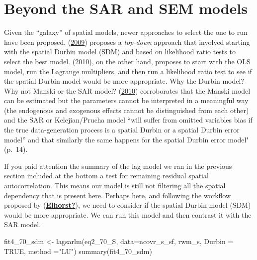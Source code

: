 \documentclass[
  krantz2]{krantz}
\makeatletter
\newenvironment{Shaded}{\begin{snugshade}}{\end{snugshade}}
\newcommand{\AttributeTok}[1]{\textcolor[rgb]{0.61,0.61,0.61}{#1}}
\newcommand{\ConstantTok}[1]{\textcolor[rgb]{0,0,0}{#1}}
\newcommand{\FunctionTok}[1]{\textcolor[rgb]{0,0,0}{#1}}
\newcommand{\NormalTok}[1]{#1}
\newcommand{\OtherTok}[1]{\textcolor[rgb]{0.37,0.37,0.37}{#1}}
\newcommand{\StringTok}[1]{\textcolor[rgb]{0.5,0.5,0.5}{#1}}
\newenvironment{kframe}{%
\medskip{}
\setlength{\fboxsep}{.8em}
 \def\at@end@of@kframe{}%
 \ifinner\ifhmode%
  \def\at@end@of@kframe{\end{minipage}}%
  \begin{minipage}{\columnwidth}%
 \fi\fi%
 \def\FrameCommand##1{\hskip\@totalleftmargin \hskip-\fboxsep
 \colorbox{shadecolor}{##1}\hskip-\fboxsep
     \hskip-\linewidth \hskip-\@totalleftmargin \hskip\columnwidth}%
 \MakeFramed {\advance\hsize-\width
   \@totalleftmargin\z@ \linewidth\hsize
   \@setminipage}}%
 {\par\unskip\endMakeFramed%
 \at@end@of@kframe}
\renewenvironment{Shaded}{\begin{kframe}}{\end{kframe}}
\makeatother
\begin{document}
\hypertarget{beyond-the-sar-and-sem-models}{%
\section{Beyond the SAR and SEM models}\label{beyond-the-sar-and-sem-models}}

Given the ``galaxy'' of spatial models, newer approaches to select the one to run have been proposed. (\protect\hyperlink{ref-LeSage_2009}{2009}) proposes a \emph{top-down} approach that involved starting with the spatial Durbin model (SDM) and based on likelihood ratio tests to select the best model. (\protect\hyperlink{ref-Elhorst_2010}{2010}), on the other hand, proposes to start with the OLS model, run the Lagrange multipliers, and then run a likelihood ratio test to see if the spatial Durbin model would be more appropriate. Why the Durbin model? Why not Manski or the SAR model? (\protect\hyperlink{ref-Elhorst_2010}{2010}) corroborates that the Manski model can be estimated but the parameters cannot be interpreted in a meaningful way (the endogenous and exogenous effects cannot be distinguished from each other) and the SAR or Kelejian/Prucha model ``will suffer from omitted variables bias if the true data-generation process is a spatial Durbin or a spatial Durbin error model'' and that similarly the same happens for the spatial Durbin error model" (p.~14).

If you paid attention the summary of the lag model we ran in the previous section included at the bottom a test for remaining residual spatial autocorrelation. This means our model is still not filtering all the spatial dependency that is present here. Perhaps here, and following the workflow proposed by (\protect\hyperlink{ref-Elhorst}{\textbf{Elhorst?}}), we need to consider if the spatial Durbin model (SDM) would be more appropriate. We can run this model and then contrast it with the SAR model.

\begin{Shaded}
\begin{Highlighting}[]
\NormalTok{fit4\_70\_sdm }\OtherTok{\textless{}{-}} \FunctionTok{lagsarlm}\NormalTok{(eq2\_70\_S, }\AttributeTok{data=}\NormalTok{ncovr\_s\_sf, rwm\_s, }\AttributeTok{Durbin =} \ConstantTok{TRUE}\NormalTok{,}
                        \AttributeTok{method =}\StringTok{"LU"}\NormalTok{)}
\FunctionTok{summary}\NormalTok{(fit4\_70\_sdm)}
\end{Highlighting}
\end{Shaded}
\end{document}
